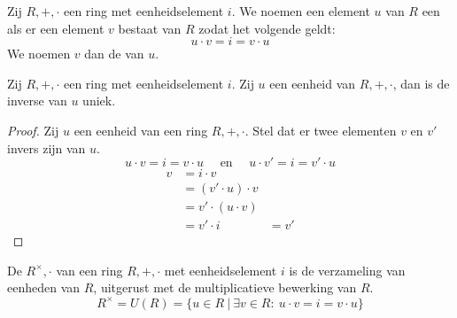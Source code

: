 \documentclass[main.tex]{subfiles}
\begin{document}
\begin{de}
  Zij $R,+,\cdot$ een ring met eenheidselement $i$.
  We noemen een element $u$ van $R$ een  als er een element $v$ bestaat van $R$ zodat het volgende geldt:
  \[ u \cdot v = i = v \cdot u \]
  We noemen $v$ dan de  van $u$.
\end{de}

\begin{st}
  Zij $R,+,\cdot$ een ring met eenheidselement $i$.
  Zij $u$ een eenheid van $R,+,\cdot$, dan is de inverse van $u$ uniek.

  \begin{proof}
    Zij $u$ een eenheid van een ring $R,+,\cdot$.
    Stel dat er twee elementen $v$ en $v'$ invers zijn van $u$.
    \[ u \cdot v = i = v \cdot u \quad\text{ en }\quad u \cdot v' = i = v' \cdot u \]
    \[
    \begin{array}{rll}
      v &= i \cdot v &\\
        &= (v' \cdot u) \cdot v &\\
        &= v' \cdot (u \cdot v) &\\
        &= v' \cdot i &= v'
    \end{array}
    \]
  \end{proof}
\end{st}

\begin{de}
  De  $R^{\times},\cdot$ van een ring $R,+,\cdot$ met eenheidselement $i$ is de verzameling van eenheden van $R$, uitgerust met de multiplicatieve bewerking van $R$.
  \[ R^{\times} = U(R) = \{ u \in R \ |\ \exists v \in R:\ u \cdot v = i = v \cdot u \} \]
\end{de}
\end{document}
